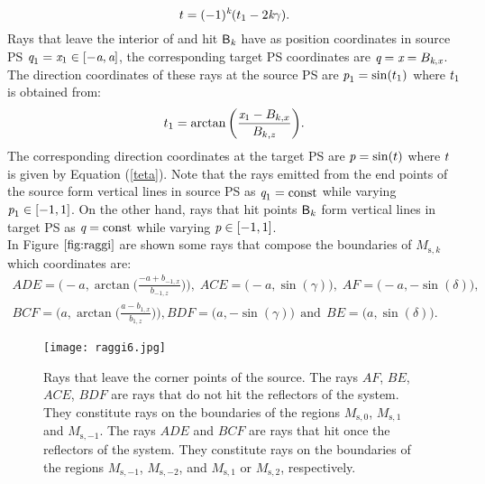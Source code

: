 \begin{equation}\label{teta}
t=(-1)^{\textit{k}}(t_1-2\textit{k}\gamma).
\end{equation}
Rays that leave the interior of  and hit $\textsf{B}_{\textit{k}}$ have as position coordinates in source PS $\textit{q}_1 = \textit{x}_1\in[-\textit{a}, \textit{a}]$, the corresponding target PS coordinates are $\textit{q} = \textit{x} = B_{\textit{k}, \textit{x}}$.
The direction coordinates of these rays at the source PS are $\textit{p}_1 = \sin(t_1)$ where $t_1$ is obtained from:
\begin{equation}\label{anglesource}
t_1 = \arctan\bigg(\frac{\textit{x}_1-B_{k,x}}{B_{k,z}}\bigg).
\end{equation}
The corresponding direction coordinates at the target PS are $\textit{p}=\sin(t)$ where $t$ is given by Equation (\ref{teta}).
Note that the rays emitted from the end points of the source form vertical lines in source PS as $\textit{q}_1= \textrm{const}$ while varying $\textit{p}_1\in[-1,1]$.
On the other hand, rays that hit points $\textsf{B}_k$ form vertical lines in target PS  as $\textit{q} = \textrm{const}$ while varying $\textit{p}\in[-1,1]$.
\\ \indent 
In Figure $\ref{fig:raggi}$ are shown some rays that compose the boundaries of $M_{\textrm{s},k}$ which coordinates are:
$$ \begin{array}{cc}ADE = \Bigg(-a, \arctan\Big(\frac{-a+b_{-1,x}}{b_{-1,z}}\Big)\Bigg),\; ACE = \big(-a, \sin(\gamma)\big),\; AF = \big(-a, -\sin(\delta)\big), \\
 BCF = \Bigg(a, \arctan\Big(\frac{a-b_{1,x}}{b_{1,z}}\Big)\Bigg), BDF = \big(a, - \sin(\gamma)\big) \, \;\mbox{and} \,\; BE = \big(a, \sin(\delta)\big).\end{array} $$
\begin{figure}
\texttt{[image: raggi6.jpg]}
\caption{\footnotesize{Rays that leave the corner points of the source. The rays $AF$, $BE$, $ACE$, $BDF$ are rays that do not hit the reflectors of the system.
They constitute rays on the boundaries of the regions $M_{\textrm{s},0}$, $M_{\textrm{s},1}$ and $M_{\textrm{s},-1}$.
 The rays $ADE$ and $BCF$ are rays that hit once the reflectors of the system. They constitute rays on the boundaries of the regions
 $M_{\textrm{s},-1}$, $M_{\textrm{s},-2}$, and $M_{\textrm{s},1}$ or $M_{\textrm{s},2}$, respectively.}}
\label{fig:raggi}
\end{figure}
